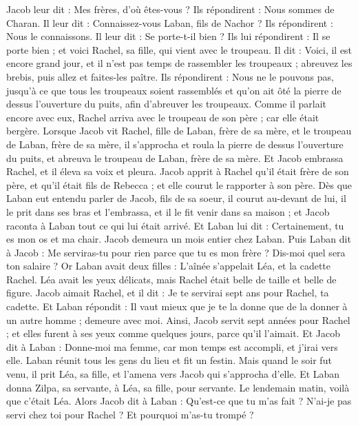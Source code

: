 \begin{multicols}{2}
Jacob leur dit : Mes frères, d'où êtes-vous ? Ils répondirent : Nous sommes de Charan.
Il leur dit : Connaissez-vous Laban, fils de Nachor ? Ils répondirent : Nous le connaissons.
Il leur dit : Se porte-t-il bien ? Ils lui répondirent : Il se porte bien ; et voici Rachel, sa fille, qui vient avec le troupeau.
Il dit : Voici, il est encore grand jour, et il n'est pas temps de rassembler les troupeaux ; abreuvez les brebis, puis allez et faites-les paître.
Ils répondirent : Nous ne le pouvons pas, jusqu'à ce que tous les troupeaux soient rassemblés et qu'on ait ôté la pierre de dessus l'ouverture du puits, afin d'abreuver les troupeaux.
Comme il parlait encore avec eux, Rachel arriva avec le troupeau de son père ; car elle était bergère.
Lorsque Jacob vit Rachel, fille de Laban, frère de sa mère, et le troupeau de Laban, frère de sa mère, il s'approcha et roula la pierre de dessus l'ouverture du puits, et abreuva le troupeau de Laban, frère de sa mère.
Et Jacob embrassa Rachel, et il éleva sa voix et pleura.
Jacob apprit à Rachel qu'il était frère de son père, et qu'il était fils de Rebecca ; et elle courut le rapporter à son père.
Dès que Laban eut entendu parler de Jacob, fils de sa soeur, il courut au-devant de lui, il le prit dans ses bras et l'embrassa, et il le fit venir dans sa maison ; et Jacob raconta à Laban tout ce qui lui était arrivé.
Et Laban lui dit : Certainement, tu es mon os et ma chair. Jacob demeura un mois entier chez Laban.
Puis Laban dit à Jacob : Me serviras-tu pour rien parce que tu es mon frère ? Dis-moi quel sera ton salaire ?
Or Laban avait deux filles : L'aînée s'appelait Léa, et la cadette Rachel.
Léa avait les yeux délicats, mais Rachel était belle de taille et belle de figure.
Jacob aimait Rachel, et il dit : Je te servirai sept ans pour Rachel, ta cadette.
Et Laban répondit : Il vaut mieux que je te la donne que de la donner à un autre homme ; demeure avec moi.
Ainsi, Jacob servit sept années pour Rachel ; et elles furent à ses yeux comme quelques jours, parce qu'il l'aimait.
Et Jacob dit à Laban : Donne-moi ma femme, car mon temps est accompli, et j'irai vers elle.
Laban réunit tous les gens du lieu et fit un festin.
Mais quand le soir fut venu, il prit Léa, sa fille, et l'amena vers Jacob qui s'approcha d'elle.
Et Laban donna Zilpa, sa servante, à Léa, sa fille, pour servante.
Le lendemain matin, voilà que c'était Léa. Alors Jacob dit à Laban : Qu'est-ce que tu m'as fait ? N'ai-je pas servi chez toi pour Rachel ? Et pourquoi m'as-tu trompé ?

\end{multicols}
